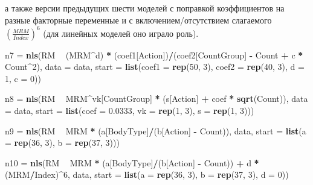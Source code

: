 \documentclass[
]{article}
\newenvironment{Shaded}{\begin{snugshade}}{\end{snugshade}}
\newcommand{\DataTypeTok}[1]{\textcolor[rgb]{0.13,0.29,0.53}{#1}}
\newcommand{\DecValTok}[1]{\textcolor[rgb]{0.00,0.00,0.81}{#1}}
\newcommand{\FloatTok}[1]{\textcolor[rgb]{0.00,0.00,0.81}{#1}}
\newcommand{\KeywordTok}[1]{\textcolor[rgb]{0.13,0.29,0.53}{\textbf{#1}}}
\newcommand{\NormalTok}[1]{#1}
\newcommand{\OperatorTok}[1]{\textcolor[rgb]{0.81,0.36,0.00}{\textbf{#1}}}
\newcommand{\StringTok}[1]{\textcolor[rgb]{0.31,0.60,0.02}{#1}}
\begin{document}
а также версии предыдущих шести моделей с поправкой коэффициентов на
разные факторные переменные и с включением/отсутствием слагаемого
\(\left( \frac{MRM}{Index} \right)^6\) (для линейных моделей оно играло
роль).

\begin{Shaded}
\begin{Highlighting}[]
\NormalTok{n7 =}\StringTok{ }\KeywordTok{nls}\NormalTok{(RM }\OperatorTok{~}\StringTok{ }\NormalTok{(MRM}\OperatorTok{^}\NormalTok{d) }\OperatorTok{*}\StringTok{ }\NormalTok{(coef1[Action])}\OperatorTok{/}\NormalTok{(coef2[CountGroup] }\OperatorTok{-}\StringTok{ }\NormalTok{Count }\OperatorTok{+}\StringTok{ }\NormalTok{c }\OperatorTok{*}\StringTok{ }\NormalTok{Count}\OperatorTok{^}\DecValTok{2}\NormalTok{), }
    \DataTypeTok{data =}\NormalTok{ data, }\DataTypeTok{start =} \KeywordTok{list}\NormalTok{(}\DataTypeTok{coef1 =} \KeywordTok{rep}\NormalTok{(}\DecValTok{50}\NormalTok{, }\DecValTok{3}\NormalTok{), }\DataTypeTok{coef2 =} \KeywordTok{rep}\NormalTok{(}\DecValTok{40}\NormalTok{, }\DecValTok{3}\NormalTok{), }\DataTypeTok{d =} \DecValTok{1}\NormalTok{, }\DataTypeTok{c =} \DecValTok{0}\NormalTok{))}


\NormalTok{n8 =}\StringTok{ }\KeywordTok{nls}\NormalTok{(RM }\OperatorTok{~}\StringTok{ }\NormalTok{MRM}\OperatorTok{^}\NormalTok{vk[CountGroup] }\OperatorTok{*}\StringTok{ }\NormalTok{(s[Action] }\OperatorTok{+}\StringTok{ }\NormalTok{coef }\OperatorTok{*}\StringTok{ }\KeywordTok{sqrt}\NormalTok{(Count)), }\DataTypeTok{data =}\NormalTok{ data, }
    \DataTypeTok{start =} \KeywordTok{list}\NormalTok{(}\DataTypeTok{coef =} \FloatTok{0.0333}\NormalTok{, }\DataTypeTok{vk =} \KeywordTok{rep}\NormalTok{(}\DecValTok{1}\NormalTok{, }\DecValTok{3}\NormalTok{), }\DataTypeTok{s =} \KeywordTok{rep}\NormalTok{(}\DecValTok{1}\NormalTok{, }\DecValTok{3}\NormalTok{)))}


\NormalTok{n9 =}\StringTok{ }\KeywordTok{nls}\NormalTok{(RM }\OperatorTok{~}\StringTok{ }\NormalTok{MRM }\OperatorTok{*}\StringTok{ }\NormalTok{(a[BodyType]}\OperatorTok{/}\NormalTok{(b[Action] }\OperatorTok{-}\StringTok{ }\NormalTok{Count)), data, }\DataTypeTok{start =} \KeywordTok{list}\NormalTok{(}\DataTypeTok{a =} \KeywordTok{rep}\NormalTok{(}\DecValTok{36}\NormalTok{, }
    \DecValTok{3}\NormalTok{), }\DataTypeTok{b =} \KeywordTok{rep}\NormalTok{(}\DecValTok{37}\NormalTok{, }\DecValTok{3}\NormalTok{)))}

\NormalTok{n10 =}\StringTok{ }\KeywordTok{nls}\NormalTok{(RM }\OperatorTok{~}\StringTok{ }\NormalTok{MRM }\OperatorTok{*}\StringTok{ }\NormalTok{(a[BodyType]}\OperatorTok{/}\NormalTok{(b[Action] }\OperatorTok{-}\StringTok{ }\NormalTok{Count)) }\OperatorTok{+}\StringTok{ }\NormalTok{d }\OperatorTok{*}\StringTok{ }\NormalTok{(MRM}\OperatorTok{/}\NormalTok{Index)}\OperatorTok{^}\DecValTok{6}\NormalTok{, data, }
    \DataTypeTok{start =} \KeywordTok{list}\NormalTok{(}\DataTypeTok{a =} \KeywordTok{rep}\NormalTok{(}\DecValTok{36}\NormalTok{, }\DecValTok{3}\NormalTok{), }\DataTypeTok{b =} \KeywordTok{rep}\NormalTok{(}\DecValTok{37}\NormalTok{, }\DecValTok{3}\NormalTok{), }\DataTypeTok{d =} \DecValTok{0}\NormalTok{))}



\end{Highlighting}
\end{Shaded}
\end{document}
